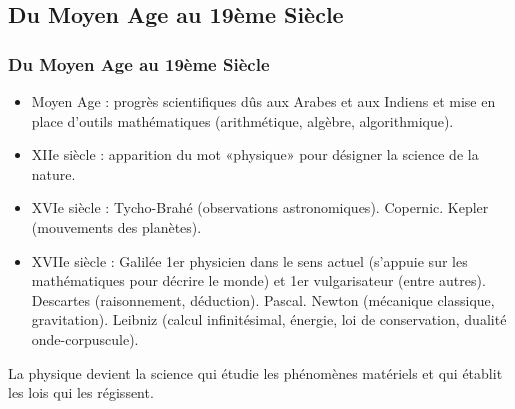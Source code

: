 \subsection[Moyen Age-19ème]{Du Moyen Age au 19ème Siècle}
\begin{frame} \frametitle{Du Moyen Age au 19ème Siècle}
  \begin{itemize}
  \item Moyen Age : progrès scientifiques dûs aux Arabes et aux Indiens et mise en
    place d'outils mathématiques (arithmétique, algèbre, algorithmique).

  \item XIIe siècle : apparition du mot «physique» pour désigner la
    science de la nature.

  \item XVIe siècle : Tycho-Brahé (observations
    astronomiques). Copernic. Kepler (mouvements des planètes).


  \item XVIIe siècle : Galilée 1er physicien dans le sens actuel
    (s'appuie sur les mathématiques pour décrire le monde) et 1er
    vulgarisateur (entre autres). Descartes (raisonnement,
    déduction). Pascal. Newton (mécanique classique,
    gravitation). Leibniz (calcul infinitésimal, énergie, loi de
    conservation, dualité onde-corpuscule).



  \end{itemize}

\alert{La physique devient la science qui étudie les phénomènes
  matériels et qui établit les lois qui les régissent.}

\end{frame}

